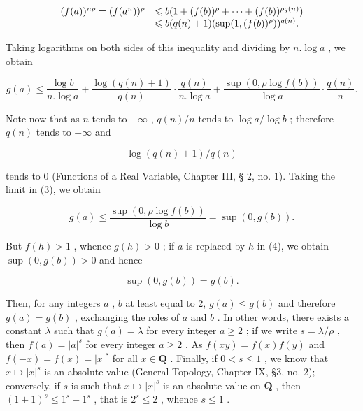 \[
\begin{array}{r l} (f (a)) ^ {n \rho} = (f (a ^ {n})) ^ {\rho} & \leqslant b (1 + (f (b)) ^ {\rho} + \dots + (f (b)) ^ {\rho q (n)}) \\ & \leqslant b (q (n) + 1) (\sup (1, (f (b)) ^ {\rho})) ^ {q (n)}. \end{array}
\]

Taking logarithms on both sides of this inequality and dividing by \(n.\log a\) , we obtain

\[
g (a) \leqslant \frac {\log b}{n . \log a} + \frac {\log (q (n) + 1)}{q (n)} \cdot \frac {q (n)}{n . \log a} + \frac {\sup (0 , \rho \log f (b))}{\log a} \cdot \frac {q (n)}{n}.\tag{3}
\]

Note now that as \(n\) tends to \(+\infty\) , \(q(n) / n\) tends to \(\log a / \log b\) ; therefore \(q(n)\) tends to \(+\infty\) and

\[
\log (q (n) + 1) / q (n)
\]

tends to 0 (Functions of a Real Variable, Chapter III, § 2, no. 1). Taking the limit in (3), we obtain

\[
g (a) \leqslant \frac {\sup (0 , \rho \log f (b))}{\log b} = \sup (0, g (b)).\tag{4}
\]

But \(f(h) > 1\) , whence \(g(h) > 0\) ; if \(a\) is replaced by \(h\) in (4), we obtain \(\sup(0, g(b)) > 0\) and hence

\[
\sup (0, g (b)) = g (b).
\]

Then, for any integers \(a\) , \(b\) at least equal to 2, \(g(a) \leqslant g(b)\) and therefore \(g(a) = g(b)\) , exchanging the roles of \(a\) and \(b\) . In other words, there exists a constant \(\lambda\) such that \(g(a) = \lambda\) for every integer \(a \geqslant 2\) ; if we write \(s = \lambda / \rho\) , then \(f(a) = |a|^s\) for every integer \(a \geqslant 2\) . As \(f(xy) = f(x)f(y)\) and \(f(-x) = f(x) = |x|^s\) for all \(x \in \mathbf{Q}\) . Finally, if \(0 < s \leqslant 1\) , we know that \(x \mapsto |x|^s\) is an absolute value (General Topology, Chapter IX, §3, no. 2); conversely, if \(s\) is such that \(x \mapsto |x|^s\) is an absolute value on \(\mathbf{Q}\) , then \((1 + 1)^s \leqslant 1^s + 1^s\) , that is \(2^s \leqslant 2\) , whence \(s \leqslant 1\) .

